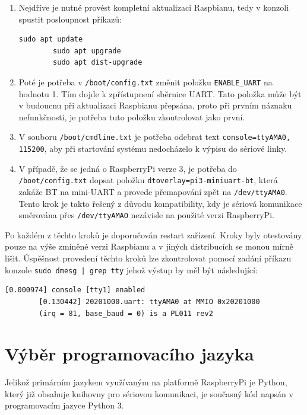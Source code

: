 \begin{enumerate}
	\item Nejdříve je nutné provést kompletní aktualizaci Raspbianu, tedy v konzoli spustit posloupnost příkazů:
	
	\begin{lstlisting}[style=MyCodeBash]
		sudo apt update
		sudo apt upgrade
		sudo apt dist-upgrade
	\end{lstlisting}
					
	\item Poté je potřeba v \texttt{/boot/config.txt} změnit položku \texttt{ENABLE\_UART} na hodnotu 1. Tím dojde k zpřístupnení sběrnice UART. Tato položka může být v budoucnu při aktualizaci Raspbianu přepsána, proto při prvním náznaku nefunkčnosti, je potřeba tuto položku zkontrolovat jako první.
	\item V souboru \texttt{/boot/cmdline.txt} je potřeba odebrat text \texttt{console=ttyAMA0, 115200}, aby při startování systému nedocházelo k výpisu do sériové linky. 
	\item V případě, že se jedná o RaspberryPi verze 3, je potřeba do \texttt{/boot/config.txt} dopsat položku \texttt{dtoverlay=pi3-miniuart-bt}, která zakáže BT na mini-UART a provede přemapování zpět na \texttt{/dev/ttyAMA0}. Tento krok je takto řešený z důvodu kompatibility, kdy je sériová komunikace směrována přes \texttt{/dev/ttyAMAO} nezávisle na použité verzi RaspberryPi.
\end{enumerate}

Po každém z těchto kroků je doporučován restart zařízení. Kroky byly otestovány pouze na výše zmíněné verzi Raspbianu a v jiných distribucích se monou mírně lišit. Úspěšnost provedení těchto kroků lze zkontrolovat pomocí zadání příkazu konzole \texttt{sudo dmesg | grep tty} jehož výstup by měl být následující:
					
	\begin{lstlisting}[style=MyCodeBash]
		[0.000974] console [tty1] enabled
		[0.130442] 20201000.uart: ttyAMA0 at MMIO 0x20201000 
		(irq = 81, base_baud = 0) is a PL011 rev2
	\end{lstlisting}
	\vspace{-20pt}



\section{Výběr programovacího jazyka}
Jelikož primárním jazykem využívaným na platformě RaspberryPi je Python, který již obsahuje knihovny pro sériovou komunikaci, je současný kód napsán v programovacím jazyce Python 3.

